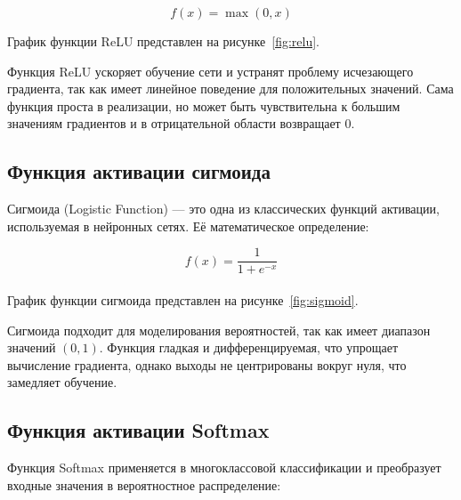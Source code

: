 \begin{equation}
    f(x) = \max(0, x)
\end{equation}

График функции ReLU представлен на рисунке~\ref{fig:relu}.


Функция ReLU ускоряет обучение сети и устранят проблему исчезающего градиента, 
так как имеет линейное поведение для положительных значений. Сама функция 
проста в реализации, но может быть чувствительна к большим значениям градиентов
и в отрицательной области возвращает 0.

\subsection{Функция активации сигмоида}
\hspace*{12.5 mm}Сигмоида (Logistic Function) — это одна из классических 
функций активации, используемая в нейронных сетях. Её математическое 
определение:

\begin{equation}
    f(x) = \frac{1}{1 + e^{-x}}
\end{equation}\\[-9mm]

График функции сигмоида представлен на рисунке~\ref{fig:sigmoid}.


Сигмоида подходит для моделирования вероятностей, так как имеет диапазон 
значений $ (0,1) $. Функция гладкая и дифференцируемая, что упрощает вычисление
градиента, однако выходы не центрированы вокруг нуля, что замедляет обучение.

\subsection{Функция активации Softmax}
\hspace*{12.5 mm}Функция Softmax применяется в многоклассовой классификации и 
преобразует входные значения в вероятностное распределение:

